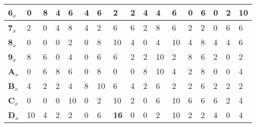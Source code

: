 \begin{longtable}[c]{|l|l|l|l|l|l|l|l|l|l|l|l|l|l|l|l|l|}
\textbf{6$_x$}  & 0              & 8              & 4              & 6              & 4              & 6              & 2              & 2              & 4              & 4              & 6              & 0              & 6              & 0              & 2              & 10             \\ \hline
\textbf{7$_x$}  & 2              & 0              & 4              & 8              & 4              & 2              & 6              & 6              & 2              & 8              & 6              & 2              & 2              & 0              & 6              & 6              \\ \hline
\textbf{8$_x$}  & 0              & 0              & 0              & 2              & 0              & 8              & 10             & 4              & 0              & 4              & 10             & 4              & 8              & 4              & 4              & 6              \\ \hline
\textbf{9$_x$}  & 8              & 6              & 0              & 4              & 0              & 6              & 6              & 2              & 2              & 10             & 2              & 8              & 6              & 2              & 0              & 2              \\ \hline
\textbf{A$_x$}  & 0              & 6              & 8              & 6              & 0              & 8              & 0              & 0              & 8              & 10             & 4              & 2              & 8              & 0              & 0              & 4              \\ \hline
\textbf{B$_x$}  & 4              & 2              & 2              & 4              & 8              & 10             & 6              & 4              & 2              & 6              & 2              & 2              & 6              & 2              & 2              & 2              \\ \hline
\textbf{C$_x$}  & 0              & 0              & 0              & 10             & 0              & 2              & 10             & 2              & 0              & 6              & 10             & 6              & 6              & 6              & 2              & 4              \\ \hline
\textbf{D$_x$}  & 10             & 4              & 2              & 2              & 0              & 6              & \textbf{16}             & 0              & 0              & 2              & 10             & 2              & 2              & 4              & 0              & 4              \\ \hline

\end{longtable}
